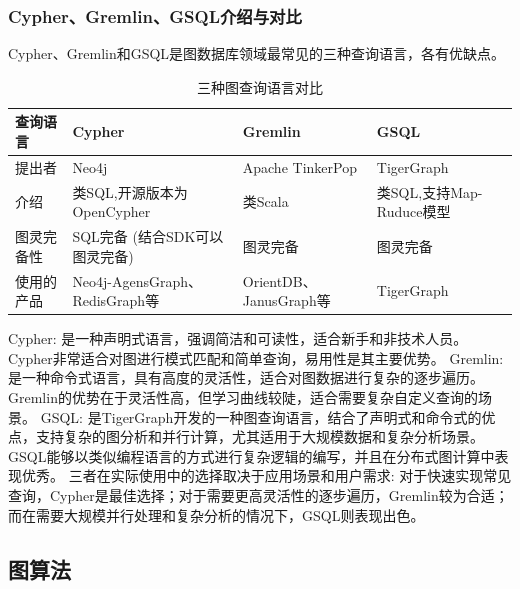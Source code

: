 \subsubsection*{Cypher、Gremlin、GSQL介绍与对比}
Cypher、Gremlin和GSQL是图数据库领域最常见的三种查询语言，各有优缺点。%
\begin{table}[htbp]
	\centering
	\caption{三种图查询语言对比}
	\begin{tabularx}{\textwidth}{|X|X|X|X| }
		\hline
		查询语言  & Cypher                       & Gremlin              & GSQL                \\
		\hline
		提出者   & Neo4j                        & Apache TinkerPop     & TigerGraph          \\
		\hline
		介绍    & 类SQL,开源版本为OpenCypher         & 类Scala               & 类SQL,支持Map-Ruduce模型 \\
		\hline
		图灵完备性 & SQL完备 (结合SDK可以图灵完备)          & 图灵完备                 & 图灵完备                \\
		\hline
		使用的产品 & Neo4j-AgensGraph、RedisGraph等 & OrientDB、JanusGraph等 & TigerGraph          \\
		\hline
	\end{tabularx}%
	\label{tab:addlabel}%
\end{table}%

Cypher: 是一种声明式语言，强调简洁和可读性，适合新手和非技术人员。Cypher非常适合对图进行模式匹配和简单查询，易用性是其主要优势。
Gremlin: 是一种命令式语言，具有高度的灵活性，适合对图数据进行复杂的逐步遍历。Gremlin的优势在于灵活性高，但学习曲线较陡，适合需要复杂自定义查询的场景。
GSQL: 是TigerGraph开发的一种图查询语言，结合了声明式和命令式的优点，支持复杂的图分析和并行计算，尤其适用于大规模数据和复杂分析场景。GSQL能够以类似编程语言的方式进行复杂逻辑的编写，并且在分布式图计算中表现优秀。
三者在实际使用中的选择取决于应用场景和用户需求: 对于快速实现常见查询，Cypher是最佳选择；对于需要更高灵活性的逐步遍历，Gremlin较为合适；而在需要大规模并行处理和复杂分析的情况下，GSQL则表现出色。

\subsection{图算法}


